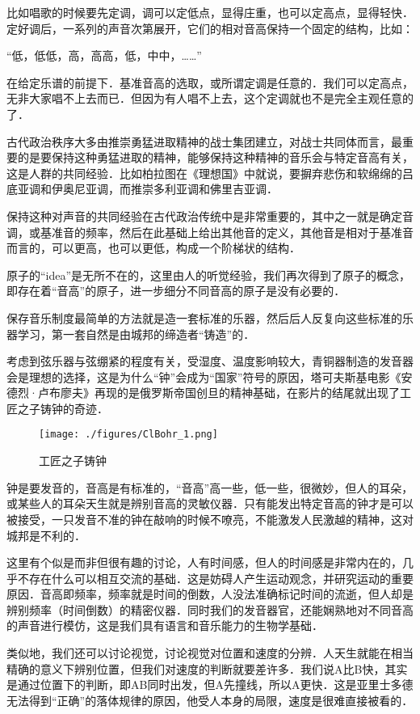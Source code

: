 比如唱歌的时候要先定调，调可以定低点，显得庄重，也可以定高点，显得轻快．定好调后，一系列的声音次第展开，它们的相对音高保持一个固定的结构，比如：

“低，低低，高，高高，低，中中，……”

在给定乐谱的前提下．基准音高的选取，或所谓定调是任意的．我们可以定高点，无非大家唱不上去而已．但因为有人唱不上去，这个定调就也不是完全主观任意的了．

古代政治秩序大多由推崇勇猛进取精神的战士集团建立，对战士共同体而言，最重要的是要保持这种勇猛进取的精神，能够保持这种精神的音乐会与特定音高有关，这是人群的共同经验．比如柏拉图在《理想国》中就说，要摒弃悲伤和软绵绵的吕底亚调和伊奥尼亚调，而推崇多利亚调和佛里吉亚调．

保持这种对声音的共同经验在古代政治传统中是非常重要的，其中之一就是确定音调，或基准音的频率，然后在此基础上给出其他音的定义，其他音是相对于基准音而言的，可以更高，也可以更低，构成一个阶梯状的结构．

原子的“idea”是无所不在的，这里由人的听觉经验，我们再次得到了原子的概念，即存在着“音高”的原子，进一步细分不同音高的原子是没有必要的．

保存音乐制度最简单的方法就是造一套标准的乐器，然后后人反复向这些标准的乐器学习，第一套自然是由城邦的缔造者“铸造”的．

考虑到弦乐器与弦绷紧的程度有关，受湿度、温度影响较大，青铜器制造的发音器会是理想的选择，这是为什么“钟”会成为“国家”符号的原因，塔可夫斯基电影《安德烈·卢布廖夫》再现的是俄罗斯帝国创旦的精神基础，在影片的结尾就出现了工匠之子铸钟的奇迹．

\begin{figure}[ht]
\centering
\texttt{[image: ./figures/ClBohr\_1.png]}
\caption{工匠之子铸钟} \label{ClBohr_fig1}
\end{figure}


钟是要发音的，音高是有标准的，“音高”高一些，低一些，很微妙，但人的耳朵，或某些人的耳朵天生就是辨别音高的灵敏仪器．只有能发出特定音高的钟才是可以被接受，一只发音不准的钟在敲响的时候不嘹亮，不能激发人民激越的精神，这对城邦是不利的．

这里有个似是而非但很有趣的讨论，人有时间感，但人的时间感是非常内在的，几乎不存在什么可以相互交流的基础．这是妨碍人产生运动观念，并研究运动的重要原因．音高即频率，频率就是时间的倒数，人没法准确标记时间的流逝，但人却是辨别频率（时间倒数）的精密仪器．同时我们的发音器官，还能娴熟地对不同音高的声音进行模仿，这是我们具有语言和音乐能力的生物学基础．

类似地，我们还可以讨论视觉，讨论视觉对位置和速度的分辨．人天生就能在相当精确的意义下辨别位置，但我们对速度的判断就要差许多．我们说A比B快，其实是通过位置下的判断，即AB同时出发，但A先撞线，所以A更快．这是亚里士多德无法得到“正确”的落体规律的原因，他受人本身的局限，速度是很难直接被看的．

